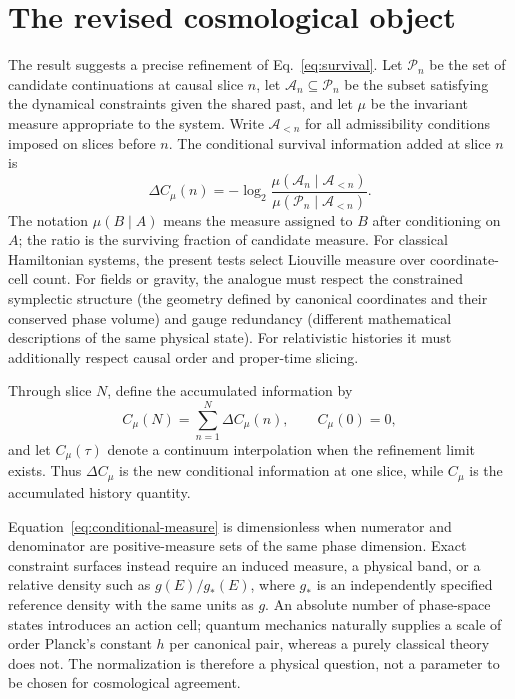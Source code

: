 \documentclass[10pt]{article}
\begin{document}
\section*{The revised cosmological object}

The result suggests a precise refinement of Eq.~\eqref{eq:survival}.  Let
$\mathcal P_n$ be the set of candidate continuations at causal slice $n$, let
$\mathcal A_n\subseteq\mathcal P_n$ be the subset satisfying the dynamical
constraints given the shared past, and let $\mu$ be the invariant measure
appropriate to the system.  Write $\mathcal A_{<n}$ for all admissibility
conditions imposed on slices before $n$.  The conditional survival information
added at slice $n$ is
\begin{equation}
\Delta C_\mu(n)
=-\log_2
\frac{\mu(\mathcal A_n\mid\mathcal A_{<n})}
     {\mu(\mathcal P_n\mid\mathcal A_{<n})}.
\label{eq:conditional-measure}
\end{equation}
The notation $\mu(B\mid A)$ means the measure assigned to $B$ after
conditioning on $A$; the ratio is the surviving fraction of candidate
measure.  For classical Hamiltonian systems, the present tests select
Liouville measure
over coordinate-cell count.  For fields or gravity, the analogue must respect
the constrained symplectic structure (the geometry defined by canonical
coordinates and their conserved phase volume) and gauge redundancy (different
mathematical descriptions of the same physical state).  For relativistic
histories it must additionally respect causal order and proper-time slicing.

Through slice $N$, define the accumulated information by
\begin{equation}
C_\mu(N)=\sum_{n=1}^{N}\Delta C_\mu(n),
\qquad C_\mu(0)=0,
\label{eq:accumulated-measure}
\end{equation}
and let $C_\mu(\tau)$ denote a continuum interpolation when the refinement
limit exists.  Thus $\Delta C_\mu$ is the new conditional information at one
slice, while $C_\mu$ is the accumulated history quantity.

Equation~\eqref{eq:conditional-measure} is dimensionless when numerator and
denominator are positive-measure sets of the same phase dimension.  Exact
constraint surfaces instead require an induced measure, a physical band, or a
relative density such as $g(E)/g_*(E)$, where $g_*$ is an independently
specified reference density with the same units as $g$.  An absolute number of
phase-space states introduces an action cell; quantum mechanics naturally
supplies a scale of order Planck's constant $h$ per canonical pair, whereas a
purely classical theory does not.
The normalization is therefore a physical question, not a parameter to be
chosen for cosmological agreement.
\end{document}
